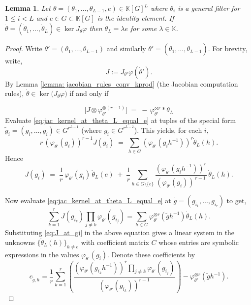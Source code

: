 \documentclass[final]{article}
\newcommand{\K}{\mathbb{K}}
\newcommand{\conv}{\ast}
\newcommand{\kprod}{\otimes}
\theoremstyle{definition}
\theoremstyle{plain}
\newtheorem{lemma}[definition]{Lemma}
\begin{document}
\begin{lemma}\label{lemma: jac_varphi_simplified_case}
    Let $\theta = (\theta_1, \hdots, \theta_{L-1}, e) \in \K[G]^L$ where $\theta_i$ is a general filter for $1\leq i < L$ and $e \in G \subset \K[G]$ is the identity element. If $\dot \theta = (\dot \theta_1, \dots, \dot \theta_L) \in \ker J_\theta \varphi$ then $\dot \theta_L = \lambda e$ for some $\lambda \in \K$.
\end{lemma}
\begin{proof}
Write $\theta'=(\theta_1,\dots,\theta_{L-1})$ and similarly $\dot\theta'=(\dot\theta_1,\dots,\dot\theta_{L-1})$.
For brevity, write,
\[
J := J_{\theta'}\varphi(\dot{\theta}').
\]
By Lemma \ref{lemma: jacobian_rules_conv_kprod} (the Jacobian computation rules),
$\dot\theta\in\ker\bigl(J_{\theta}\varphi\bigr)$ if and only if

\begin{equation}\label{eq:jac_kernel_at_theta_L_equal_e}
\bigl[J\kprod \varphi_{\theta'}^{\otimes (r-1)}\bigr]
\;=\;
-\,\varphi_{\theta'}^{\otimes r}\conv \dot\theta_L
\end{equation}
Evaluate \eqref{eq:jac_kernel_at_theta_L_equal_e} at tuples of the special form $\tilde g_i=(g_i,\dots,g_i)\in G^{r^{L-1}}$
(where $g_i\in G^{r^{L-2}}$). This yields, for each $i$,
\[
r\,(\varphi_{\theta'}(g_i))^{r-1} J(g_i) \;=\; \sum_{h\in G} (\varphi_{\theta'}(g_i h^{-1}))^r \dot\theta_L(h).
\]
Hence
\begin{equation}\label{eq:J_at_gi}
J(g_i)
\;=\;
\frac{1}{r}\,\varphi_{\theta'}(g_i)\,\dot\theta_L(e)
\;+\;
\frac{1}{r}\sum_{h\in G\setminus\{e\}}
\frac{(\varphi_{\theta'}(g_i   h^{-1}))^r}{(\varphi_{\theta'}(g_i))^{\,{r-1}}}\,\dot\theta_L(h).
\end{equation}

Now evaluate \eqref{eq:jac_kernel_at_theta_L_equal_e} at $\tilde g=(g_{i_1},\dots,g_{i_r})$ to get,
\[
\sum_{k=1}^r J(g_{i_k}) \prod_{j\neq k} \varphi_{\theta'}(g_{i_j}) = \sum_{h\in G}\varphi_{\theta'}^{\otimes r}(\tilde{g}   h^{-1})\dot{\theta}_L(h).
\]
Substituting \eqref{eq:J_at_gi} in the above equation gives a linear system in the unknowns $\{\dot\theta_L(h)\}_{h\neq e}$ with coefficient matrix $C$ whose entries are symbolic expressions in the values $\varphi_{\theta'}(g_i)$. Denote these coefficients by 
\[
c_{\tilde{g}, h} = \dfrac{1}{r} \sum_{k=1}^r \left(\dfrac{(\varphi_{\theta'}(g_{i_k}   h^{-1}))^r\prod_{j\neq k}\varphi_{\theta'}(g_{i_j})}{(\varphi_{\theta'}(g_{i_k}))^{r-1}}\right) - \varphi_{\theta'}^{\otimes r}(\tilde{g} h^{-1}).
\]


\end{proof}
\end{document}

